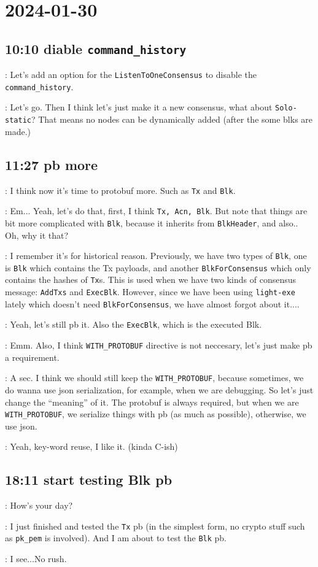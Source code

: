 
\section*{2024-01-30}

\subsection*{10:10 diable \texttt{command\_history} \cola{[done at 11:26]}}

 : Let's add an option for the \texttt{ListenToOneConsensus} to
disable the \texttt{command\_history}.

 : Let's go. Then I think let's just make it a new consensus, what
about \texttt{Solo-static}? That means no nodes can be dynamically added (after
the some blks are made.)

\subsection*{11:27 pb more}

 : I think now it's time to protobuf more. Such as \texttt{Tx} and
\texttt{Blk}.

 : Em... Yeah, let's do that, first, I think \texttt{Tx, Acn,
  Blk}. But note that things are bit more complicated with \texttt{Blk}, because
it inherits from \texttt{BlkHeader}, and also.. Oh, why it that?

 : I remember it's for historical reason. Previously, we have two
types of \texttt{Blk}, one is \texttt{Blk} which contains the Tx payloads, and
another \texttt{BlkForConsensus} which only contains the hashes of \texttt{Tx}s.
This is used when we have two kinds of consensus message: \texttt{AddTxs} and
\texttt{ExecBlk}. However, since we have been using \texttt{light-exe} lately
which doesn't need \texttt{BlkForConsensus}, we have almost forgot about it....

 : Yeah, let's still pb it. Also the \texttt{ExecBlk}, which is
the executed Blk.

 : Emm. Also, I think \texttt{WITH\_PROTOBUF} directive is not
neccesary, let's just make pb a requirement.

 : A sec. I think we should still keep the
\texttt{WITH\_PROTOBUF}, because sometimes, we do wanna use json serialization,
for example, when we are debugging. So let's just change the ``meaning'' of it.
The protobuf is always required, but when we are \texttt{WITH\_PROTOBUF}, we
serialize things with pb (as much as possible), otherwise, we use json.

 : Yeah, key-word reuse, I like it. (kinda C-ish)

\subsection*{18:11 start testing Blk pb}
 : How's your day?

 : I just finished and tested the \texttt{Tx} pb (in the simplest form, no
crypto stuff such as \texttt{pk\_pem} is involved). And I am about to test the
\texttt{Blk} pb.

 : I see...No rush.